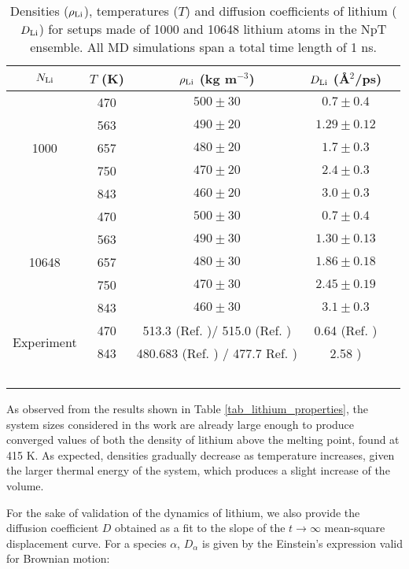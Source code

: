 \documentclass[jcp,amsmath,amssymb,preprint]{revtex4-1}
\begin{document}
\begin{table}
        \caption{Densities ($\rho_{\rm Li}$),  temperatures ($T$) and diffusion coefficients of lithium ($D_{\rm Li}$) for setups made of 1000 and 10648 lithium atoms in the NpT ensemble.  All MD simulations span a total time length of 1 ns.}
        \centering
        \begin{tabular}{c|c|ccc}
        \toprule
        $N_{\rm Li}$ & $T$ (K) & $\rho_{\rm Li}$ (kg m$^{-3}$)& $D_{\rm Li}$ (\AA$^2$/ps) \\ \hline
        \multirow{5}{*}{1000} & 470 & $500 \pm 30$ & $0.7 \pm 0.4$ \\
        ~ & 563 & $490 \pm 20$ & $1.29 \pm 0.12$ \\
        ~ & 657 & $480 \pm 20$ & $1.7 \pm 0.3$ \\
        ~ & 750 & $470 \pm 20$ & $2.4 \pm 0.3$ \\
        ~ & 843 & $460 \pm 20$ & $3.0 \pm 0.3$ \\ \hline
        \multirow{5}{*}{10648} & 470 & $500 \pm 30$ & $0.7 \pm 0.4$ \\
        ~ & 563 & $490 \pm 30$ & $1.30 \pm 0.13$ \\
        ~ & 657 & $480 \pm 30$ & $1.86 \pm 0.18$ \\
        ~ & 750 & $470 \pm 30$ & $2.45 \pm 0.19$ \\
        ~ & 843 & $460 \pm 30$ & $3.1 \pm 0.3$ \\ \hline\hline
        \multirow{2}{*}{Experiment} & 470 & 513.3 (Ref. \cite{zinkle1998summary})/ 515.0 (Ref. \cite{davison1968compilation}) & 0.64 (Ref. \cite{canales1993molecular}) \\
        & 843 & 480.683 (Ref. \cite{zinkle1998summary}) / 477.7 Ref. \cite{davison1968compilation}) & 2.58 \cite{canales1993molecular})\\\hline \hline
        \multicolumn{1}{c}{~} 
        \label{tab_lithium_properties}
        \end{tabular} 
\end{table}

As observed from the results shown in Table \ref{tab_lithium_properties}, the system sizes considered in ths work are already large enough to produce converged values of both the density of lithium above the melting point,  found at 415 K.  As expected,  densities gradually decrease as temperature increases, given the larger thermal energy of the system, which produces a slight increase of the volume.  

For the sake of validation of the dynamics of lithium, we also provide the diffusion coefficient $D$ obtained as a fit to the slope of the $t \rightarrow \infty$ mean-square displacement curve.  For a species $\alpha$, $D_\alpha$ is given by the Einstein's expression valid for Brownian motion:
\end{document}
